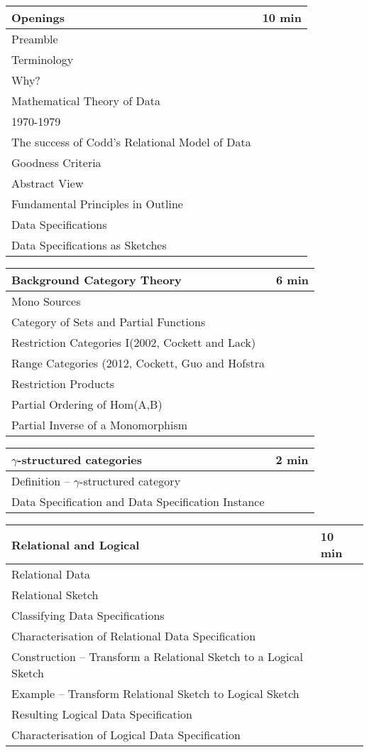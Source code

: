 \documentclass[12pt,a4paper]{article}
\begin{document}
\begin{tabular}{|l|p{3cm}|}
\hline
Openings & 10 min\\
\hline
Preamble & \\
Terminology & \\
Why?& \\
Mathematical Theory of Data& \\
1970-1979& \\
The success of Codd’s Relational Model of Data& \\
Goodness Criteria& \\
Abstract View& \\
Fundamental Principles in Outline& \\
Data Specifications& \\
Data Specifications as Sketches& \\
\end{tabular} 

\begin{tabular}{|l|l|}
\hline
Background Category Theory   & 6 min\\
\hline
Mono Sources& \\
Category of Sets and Partial Functions& \\
Restriction Categories I(2002, Cockett and Lack)& \\
Range Categories (2012, Cockett, Guo and Hofstra& \\
Restriction Products& \\
Partial Ordering of Hom(A,B)& \\
Partial Inverse of a Monomorphism& \\
\end{tabular}

\begin{tabular}{|l|l|}
\hline
$\gamma$-structured categories  & 2 min \\
\hline
Definition – $\gamma$-structured category& \\
Data Specification and Data Specification Instance& \\
\end{tabular}

\begin{tabular}{|l|l|}
\hline
Relational and Logical & 10 min\\
\hline
Relational Data& \\
Relational Sketch& \\
Classifying Data Specifications& \\
Characterisation of Relational Data Specification& \\
Construction -- Transform a Relational Sketch to a Logical Sketch& \\
Example -- Transform Relational Sketch to Logical Sketch& \\
Resulting Logical Data Specification& \\
Characterisation of Logical Data Specification& \\
\end{tabular}
\end{document}
